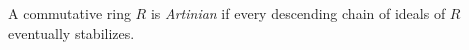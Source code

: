 
A commutative ring $R$ is \emph{Artinian} if every descending chain of ideals of $R$ eventually stabilizes.
